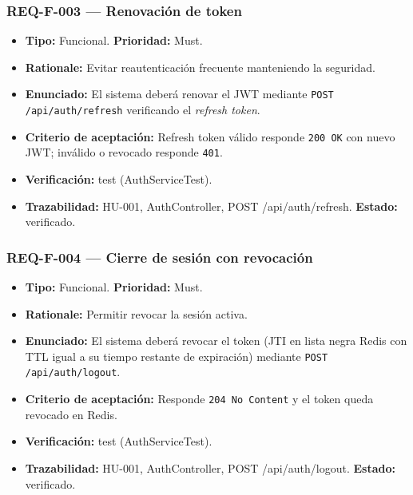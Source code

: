 \documentclass[12pt,a4paper]{article}
\begin{document}
\subsubsection{REQ-F-003 --- Renovación de token}
\begin{itemize}
  \item \textbf{Tipo:} Funcional. \textbf{Prioridad:} Must.
  \item \textbf{Rationale:} Evitar reautenticación frecuente manteniendo la seguridad.
  \item \textbf{Enunciado:} El sistema deberá renovar el JWT mediante \texttt{POST /api/auth/refresh} verificando el \textit{refresh token}.
  \item \textbf{Criterio de aceptación:} Refresh token válido responde \texttt{200 OK} con nuevo JWT; inválido o revocado responde \texttt{401}.
  \item \textbf{Verificación:} test (AuthServiceTest).
  \item \textbf{Trazabilidad:} HU-001, AuthController, POST /api/auth/refresh. \textbf{Estado:} verificado.
\end{itemize}

\subsubsection{REQ-F-004 --- Cierre de sesión con revocación}
\begin{itemize}
  \item \textbf{Tipo:} Funcional. \textbf{Prioridad:} Must.
  \item \textbf{Rationale:} Permitir revocar la sesión activa.
  \item \textbf{Enunciado:} El sistema deberá revocar el token (JTI en lista negra Redis con TTL igual a su tiempo restante de expiración) mediante \texttt{POST /api/auth/logout}.
  \item \textbf{Criterio de aceptación:} Responde \texttt{204 No Content} y el token queda revocado en Redis.
  \item \textbf{Verificación:} test (AuthServiceTest).
  \item \textbf{Trazabilidad:} HU-001, AuthController, POST /api/auth/logout. \textbf{Estado:} verificado.
\end{itemize}
\end{document}
